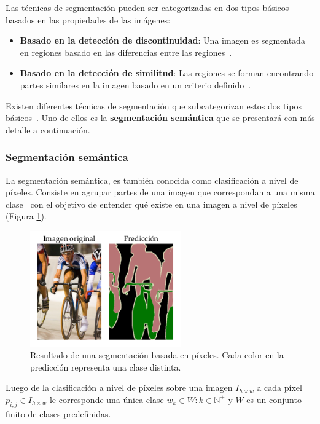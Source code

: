 Las técnicas de segmentación pueden ser categorizadas en dos tipos básicos basados en las propiedades de las imágenes:

\begin{itemize}
	\item \textbf{Basado en la detección de discontinuidad}: Una imagen es segmentada en regiones basado en las diferencias entre las regiones~\cite{sundararajan2017digital}.
	\item \textbf{Basado en la detección de similitud}: Las regiones se forman encontrando partes similares en la imagen basado en un criterio definido~\cite{sundararajan2017digital}.
\end{itemize}

Existen diferentes técnicas de segmentación que subcategorizan estos dos tipos básicos~\cite{anjna2017review}. Uno de ellos es la \textbf{segmentación semántica} que se presentará con más detalle a continuación.

\subsubsection{Segmentación semántica}

La segmentación semántica, es también conocida como clasificación a nivel de píxeles. Consiste en agrupar partes de una imagen que correspondan a una misma clase~\cite{thoma2016survey} con el objetivo de entender qué existe en una imagen a nivel de píxeles (Figura \ref{fig:semseg}).

\begin{figure}[ht]
	\centering
	\includegraphics[width=6.5cm]{./Graphics/semseg.png}
	\caption{Resultado de una segmentación basada en píxeles. Cada color en la predicción representa una clase distinta.}
	\label{fig:semseg}
\end{figure}

\begin{property}
	Luego de la clasificación a nivel de píxeles sobre una imagen $I_{h \times w}$ a cada píxel $p_{i, j} \in I_{h \times w}$ le corresponde una única clase $w_k \in W: k \in \mathbb{N}^+$ y $W$ es un conjunto finito de clases predefinidas.
\end{property}

